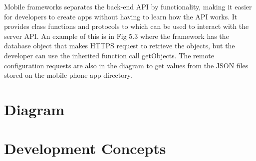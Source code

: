 Mobile frameworks separates the back-end API by functionality, making it easier for developers to create apps without having to learn how the API works. It provides class functions and protocols to which can be used to interact with the server API. An example of this is in Fig 5.3 where the framework has the database object that makes HTTPS request to retrieve the objects, but the developer can use the inherited function call getObjects. The
remote configuration requests are also in the diagram to get values from the JSON files stored on the mobile phone app directory.


\section{Diagram}

\section{Development Concepts}
